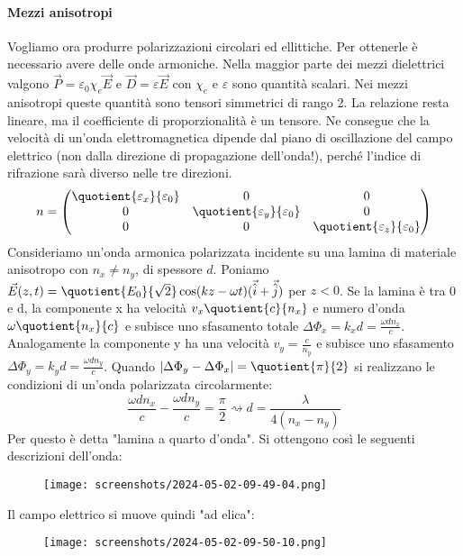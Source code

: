 \paragraph{Mezzi anisotropi}
Vogliamo ora produrre polarizzazioni circolari ed ellittiche. Per ottenerle è necessario avere delle onde armoniche. Nella maggior parte dei mezzi dielettrici valgono \(\vec{P}= \varepsilon _0 \chi _e \vec{E}\) e \(\vec{D}= \varepsilon \vec{E}\) con \(\chi _e\) e \(\varepsilon \) sono quantità scalari. Nei mezzi anisotropi queste quantità sono tensori simmetrici di rango 2. La relazione resta lineare, ma il coefficiente di proporzionalità è un tensore. Ne consegue che la velocità di un'onda elettromagnetica dipende dal piano di oscillazione del campo elettrico (non dalla direzione di propagazione dell'onda!), perché l'indice di rifrazione sarà diverso nelle tre direzioni.
\begin{equation}
	n =
	\begin{pmatrix}
		\quotient{\varepsilon _x}{\varepsilon _0} & 0 & 0\\
		0 & \quotient{\varepsilon _y}{\varepsilon _0} & 0\\
		0 & 0 & \quotient{\varepsilon _z}{\varepsilon _0}\\   
	\end{pmatrix}
\end{equation}
Consideriamo un'onda armonica polarizzata incidente su una lamina di materiale anisotropo con \(n_x \neq n_y\), di spessore \(d\). Poniamo \(\vec{E}(z,t)=\quotient{E_0}{\sqrt{2} }  \cos (kz- \omega t)(\vec{\hat{i}} + \vec{\hat{j}})\) per \(z <0\). Se la lamina è tra 0 e d, la componente x ha velocità \(v_x \quotient{c}{n_x} \) e numero d'onda \(\omega \quotient{n_x}{c} \) e subisce uno sfasamento totale \(\Delta \Phi_x = k_x d = \frac{\omega d n_x}{c}\). Analogamente la componente y ha una velocità \(v_y = \frac{c}{n_y}\) e subisce uno sfasamento \(\Delta \Phi _y = k_y d = \frac{\omega d n_y}{c}\). Quando \(\vert \Delta \Phi _y - \Delta \Phi _x \vert = \quotient{\pi }{2} \) si realizzano le condizioni di un'onda polarizzata circolarmente:
\begin{equation}
	\frac{\omega d n_x}{c} - \frac{\omega d n_y}{c} = \frac{\pi}{2} \rightsquigarrow d = \frac{\lambda }{4(n_x - n_y)}
\end{equation}
Per questo è detta "lamina a quarto d'onda".
Si ottengono così le seguenti descrizioni dell'onda:
\begin{figure}[H]
	\centering
	\texttt{[image: screenshots/2024-05-02-09-49-04.png]}
\end{figure}
Il campo elettrico si muove quindi "ad elica":
\begin{figure}[H]
	\centering
	\texttt{[image: screenshots/2024-05-02-09-50-10.png]}
\end{figure}